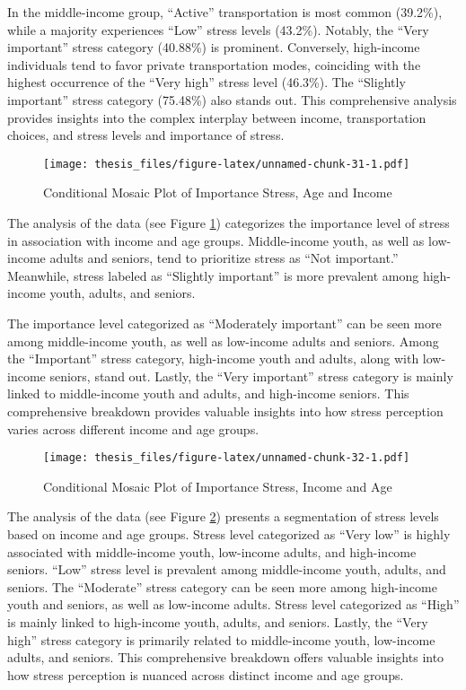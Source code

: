 \documentclass[
11pt, %
oneside, %
english, %
singlespacing, %
]{macthesis} %
\begin{document}
In the middle-income group, ``Active'' transportation is most common (39.2\%), while a majority experiences ``Low'' stress levels (43.2\%). Notably, the ``Very important'' stress category (40.88\%) is prominent. Conversely, high-income individuals tend to favor private transportation modes, coinciding with the highest occurrence of the ``Very high'' stress level (46.3\%). The ``Slightly important'' stress category (75.48\%) also stands out. This comprehensive analysis provides insights into the complex interplay between income, transportation choices, and stress levels and importance of stress.
\begin{figure}
\centering
\texttt{[image: thesis\_files/figure-latex/unnamed-chunk-31-1.pdf]}
\caption{\label{fig:unnamed-chunk-31}\label{fig:Income Age and importance of stress}Conditional Mosaic Plot of Importance Stress, Age and Income}
\end{figure}
The analysis of the data (see Figure \ref{fig:Income Age and importance of stress}) categorizes the importance level of stress in association with income and age groups. Middle-income youth, as well as low-income adults and seniors, tend to prioritize stress as ``Not important.'' Meanwhile, stress labeled as ``Slightly important'' is more prevalent among high-income youth, adults, and seniors.

The importance level categorized as ``Moderately important'' can be seen more among middle-income youth, as well as low-income adults and seniors. Among the ``Important'' stress category, high-income youth and adults, along with low-income seniors, stand out. Lastly, the ``Very important'' stress category is mainly linked to middle-income youth and adults, and high-income seniors. This comprehensive breakdown provides valuable insights into how stress perception varies across different income and age groups.
\begin{figure}
\centering
\texttt{[image: thesis\_files/figure-latex/unnamed-chunk-32-1.pdf]}
\caption{\label{fig:unnamed-chunk-32}\label{fig:Income-Age-stress}Conditional Mosaic Plot of Importance Stress, Income and Age}
\end{figure}
The analysis of the data (see Figure \ref{fig:Income-Age-stress}) presents a segmentation of stress levels based on income and age groups. Stress level categorized as ``Very low'' is highly associated with middle-income youth, low-income adults, and high-income seniors. ``Low'' stress level is prevalent among middle-income youth, adults, and seniors. The ``Moderate'' stress category can be seen more among high-income youth and seniors, as well as low-income adults. Stress level categorized as ``High'' is mainly linked to high-income youth, adults, and seniors. Lastly, the ``Very high'' stress category is primarily related to middle-income youth, low-income adults, and seniors. This comprehensive breakdown offers valuable insights into how stress perception is nuanced across distinct income and age groups.
\end{document}
